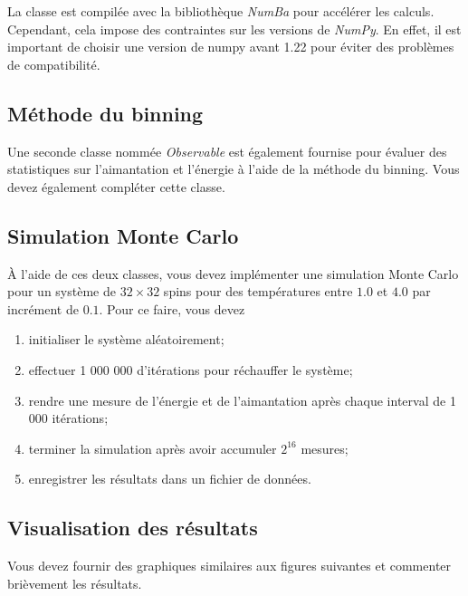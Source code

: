 \documentclass{article}
\begin{document}
La classe est compilée avec la bibliothèque \textit{NumBa} pour accélérer les calculs.
Cependant, cela impose des contraintes sur les versions de \textit{NumPy}.
En effet, il est important de choisir une version de numpy avant 1.22 pour éviter des problèmes 
de compatibilité.

\subsection{Méthode du binning}

Une seconde classe nommée \textit{Observable} est également fournise pour 
évaluer des statistiques sur l'aimantation et l'énergie à l'aide de la méthode du binning.
Vous devez également compléter cette classe.

\subsection{Simulation Monte Carlo}

À l'aide de ces deux classes, vous devez implémenter une simulation Monte Carlo 
pour un système de $32 \times 32$ spins pour des températures entre $1.0$ et $4.0$ 
par incrément de $0.1$.
Pour ce faire, vous devez
\begin{enumerate}
    \item initialiser le système aléatoirement;
    \item effectuer 1 000 000 d'itérations pour réchauffer le système;
    \item rendre une mesure de l'énergie et de l'aimantation après chaque interval de 1 000 itérations;
    \item terminer la simulation après avoir accumuler $2^{16}$ mesures;
    \item enregistrer les résultats dans un fichier de données.
\end{enumerate}

\subsection{Visualisation des résultats}

Vous devez fournir des graphiques similaires aux figures suivantes 
et commenter brièvement les résultats.
\end{document}
